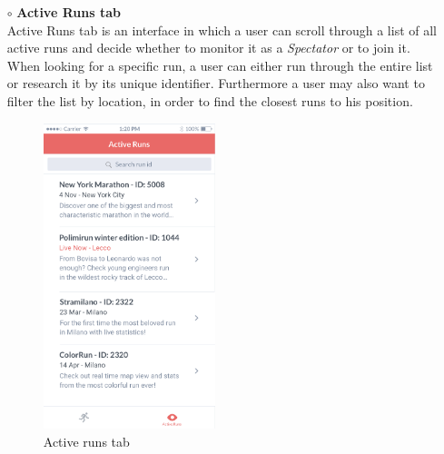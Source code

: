 \documentclass[titlepage]{article}
\begin{document}
\begin{itemize}
\begin{itemize}
\begin{itemize}
					\item[$\circ$] {\bf Active Runs tab} \\
Active Runs tab is an interface in which a user can scroll through a list of all active runs and decide whether to monitor it as a {\it Spectator} or to join it. When looking for a specific run, a user can either run through the entire list or research it by its unique identifier. Furthermore a user may also want to filter the list by location, in order to find the closest runs to his position.\\
					\begin{figure}[H]
						\center
  						\includegraphics[width=5cm]{Mockup/mockupActiveRunsSU.png}
  						\caption{Active runs tab}
 					 	\label{fig:ActiveRuns}
					\end{figure}
				\end{itemize}


\end{itemize}
\end{itemize}
\end{document}
